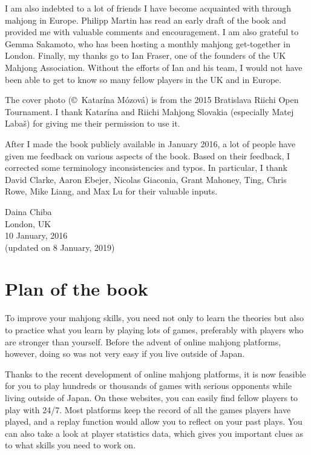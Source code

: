 \bigskip
I am also indebted to a lot of friends I have become acquainted with through mahjong in Europe. Philipp Martin has read an early draft of the book and provided me with valuable comments and encouragement. I am also grateful to Gemma Sakamoto, who has been hosting a monthly mahjong get-together in London. 
Finally, my thanks go to Ian Fraser, one of the founders of the UK Mahjong Association. 
Without the efforts of Ian and his team, I would not have been able to get to know so many fellow players in the UK and in Europe.

\bigskip
The cover photo (\copyright~Katar\'{i}na M\'{o}zov\'{a}) is from the 2015 Bratislava Riichi Open Tournament. I thank Katar\'{i}na and Riichi Mahjong Slovakia (especially Matej Laba\v{s}) for giving me their permission to use it.

\bigskip
After I made the book publicly available in January 2016, a lot of people have given me feedback on various aspects of the book. Based on their feedback, I corrected some terminology inconsistencies and typos. In particular, I thank David Clarke, Aaron Ebejer, Nicolas Giaconia, Grant Mahoney, Ting, Chris Rowe, Mike Liang, and Max Lu for their valuable inputs.

\vfill

\hfill Daina Chiba\\
\hfill London, UK\\
\hfill 10 January, 2016\\
\hfill (updated on 8 January, 2019)

\section*{Plan of the book}

To improve your mahjong skills, you need not only to learn the theories but also to practice what you learn by playing lots of games, preferably with players who are stronger than yourself. Before the advent of online mahjong platforms, however, doing so was not very easy if you live outside of Japan. 

\bigskip
Thanks to the recent development of online mahjong platforms, it is now feasible for you to play hundreds or thousands of games with serious opponents while living outside of Japan. On these websites, you can easily find fellow players to play with 24/7. Most platforms keep the record of all the games players have played, and a replay function would allow you to reflect on your past plays. You can also take a look at player statistics data, which gives you important clues as to what skills you need to work on.  


